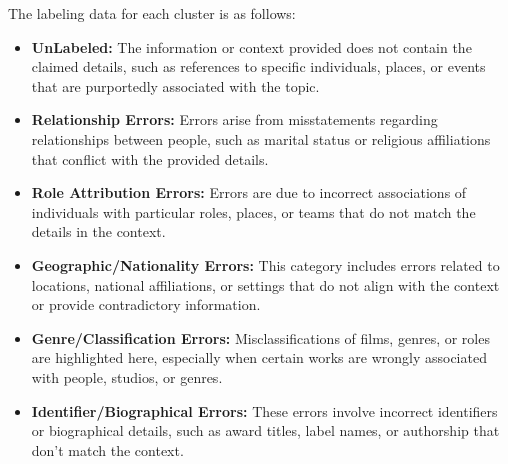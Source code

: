 The labeling data for each cluster is as follows:
\begin{itemize}
    \item \textbf{UnLabeled:} The information or context provided does not contain the claimed details, such as references to specific individuals, places, or events that are purportedly associated with the topic.
    \item \textbf{Relationship Errors:} Errors arise from misstatements regarding relationships between people, such as marital status or religious affiliations that conflict with the provided details.
    \item \textbf{Role Attribution Errors:} Errors are due to incorrect associations of individuals with particular roles, places, or teams that do not match the details in the context.
    \item \textbf{Geographic/Nationality Errors:} This category includes errors related to locations, national affiliations, or settings that do not align with the context or provide contradictory information.
    \item \textbf{Genre/Classification Errors:} Misclassifications of films, genres, or roles are highlighted here, especially when certain works are wrongly associated with people, studios, or genres.
    \item \textbf{Identifier/Biographical Errors:} These errors involve incorrect identifiers or biographical details, such as award titles, label names, or authorship that don’t match the context.
\end{itemize}


